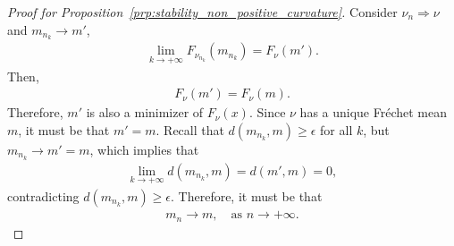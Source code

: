\begin{proof}[Proof for Proposition~\ref{prp:stability_non_positive_curvature}]
    Consider $\nu_n \Rightarrow \nu$ and $m_{n_k} \to m'$,
    \begin{align*}
        \lim_{k \to +\infty} F_{\nu_{n_k}}(m_{n_k}) = F_\nu(m').
    \end{align*}
    Then,
    \begin{align*}
        F_\nu(m') = F_\nu(m).
    \end{align*}
    Therefore, $m'$ is also a minimizer of $F_\nu(x)$.
    Since $\nu$ has a unique Fréchet mean $m$, it must be that $m' = m$.
    Recall that $d(m_{n_k}, m) \geq \epsilon$ for all $k$, but $m_{n_k} \to m' = m$, which implies that
    \begin{align*}
        \lim_{k \to +\infty} d(m_{n_k}, m) = d(m', m) = 0,
    \end{align*}
    contradicting $d(m_{n_k}, m) \geq \epsilon$.
    Therefore, it must be that
    \begin{align*}
        m_n \to m, \quad \text{as $n \to +\infty$}.
    \end{align*}
\end{proof}

